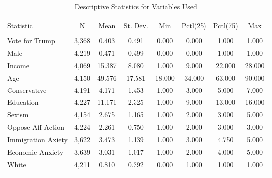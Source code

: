 
\begin{table}[!htbp] \centering 
  \caption{Descriptive Statistics for Variables Used} 
  \label{tab: desc} 
\begin{tabular}{@{\extracolsep{5pt}}lccccccc} 
\\[-1.8ex]\hline 
\hline \\[-1.8ex] 
Statistic & \multicolumn{1}{c}{N} & \multicolumn{1}{c}{Mean} & \multicolumn{1}{c}{St. Dev.} & \multicolumn{1}{c}{Min} & \multicolumn{1}{c}{Pctl(25)} & \multicolumn{1}{c}{Pctl(75)} & \multicolumn{1}{c}{Max} \\ 
\hline \\[-1.8ex] 
Vote for Trump & 3,368 & 0.403 & 0.491 & 0.000 & 0.000 & 1.000 & 1.000 \\ 
Male & 4,219 & 0.471 & 0.499 & 0.000 & 0.000 & 1.000 & 1.000 \\ 
Income & 4,069 & 15.387 & 8.080 & 1.000 & 9.000 & 22.000 & 28.000 \\ 
Age & 4,150 & 49.576 & 17.581 & 18.000 & 34.000 & 63.000 & 90.000 \\ 
Conservative & 4,191 & 4.171 & 1.453 & 1.000 & 3.000 & 5.000 & 7.000 \\ 
Education & 4,227 & 11.171 & 2.325 & 1.000 & 9.000 & 13.000 & 16.000 \\ 
Sexism & 4,154 & 2.675 & 1.165 & 1.000 & 2.000 & 3.000 & 5.000 \\ 
Oppose Aff Action & 4,224 & 2.261 & 0.750 & 1.000 & 2.000 & 3.000 & 3.000 \\ 
Immigration Axiety & 3,622 & 3.473 & 1.139 & 1.000 & 3.000 & 4.750 & 5.000 \\ 
Economic Anxiety & 3,639 & 3.031 & 1.017 & 1.000 & 2.000 & 4.000 & 5.000 \\ 
White & 4,211 & 0.810 & 0.392 & 0.000 & 1.000 & 1.000 & 1.000 \\ 
\hline \\[-1.8ex] 
\end{tabular} 
\end{table} 
